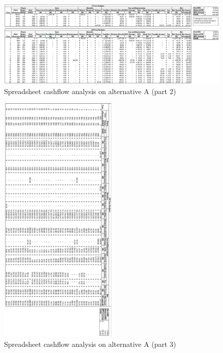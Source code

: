 \documentclass[10pt,letterpaper]{article}
\begin{document}
\begin{figure}[H]
	\centering
	\includegraphics[width=1.0\textwidth]{assets/1534570611392}
	\caption{Spreadsheet cashflow analysis on alternative A (part 2)}
\end{figure}

\begin{figure}[H]
	\centering
	\includegraphics[width=0.5\textwidth]{assets/1534570644880}
	\caption{Spreadsheet cashflow analysis on alternative A (part 3)}
\end{figure}
\end{document}
